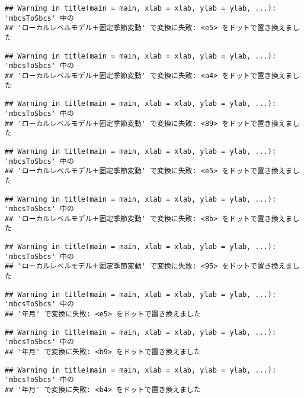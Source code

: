 \documentclass[]{article}
\begin{document}
\begin{verbatim}
## Warning in title(main = main, xlab = xlab, ylab = ylab, ...): 'mbcsToSbcs' 中の
## 'ローカルレベルモデル＋固定季節変動' で変換に失敗: <e5> をドットで置き換えました
\end{verbatim}

\begin{verbatim}
## Warning in title(main = main, xlab = xlab, ylab = ylab, ...): 'mbcsToSbcs' 中の
## 'ローカルレベルモデル＋固定季節変動' で変換に失敗: <a4> をドットで置き換えました
\end{verbatim}

\begin{verbatim}
## Warning in title(main = main, xlab = xlab, ylab = ylab, ...): 'mbcsToSbcs' 中の
## 'ローカルレベルモデル＋固定季節変動' で変換に失敗: <89> をドットで置き換えました
\end{verbatim}

\begin{verbatim}
## Warning in title(main = main, xlab = xlab, ylab = ylab, ...): 'mbcsToSbcs' 中の
## 'ローカルレベルモデル＋固定季節変動' で変換に失敗: <e5> をドットで置き換えました
\end{verbatim}

\begin{verbatim}
## Warning in title(main = main, xlab = xlab, ylab = ylab, ...): 'mbcsToSbcs' 中の
## 'ローカルレベルモデル＋固定季節変動' で変換に失敗: <8b> をドットで置き換えました
\end{verbatim}

\begin{verbatim}
## Warning in title(main = main, xlab = xlab, ylab = ylab, ...): 'mbcsToSbcs' 中の
## 'ローカルレベルモデル＋固定季節変動' で変換に失敗: <95> をドットで置き換えました
\end{verbatim}

\begin{verbatim}
## Warning in title(main = main, xlab = xlab, ylab = ylab, ...): 'mbcsToSbcs' 中の
## '年月' で変換に失敗: <e5> をドットで置き換えました
\end{verbatim}

\begin{verbatim}
## Warning in title(main = main, xlab = xlab, ylab = ylab, ...): 'mbcsToSbcs' 中の
## '年月' で変換に失敗: <b9> をドットで置き換えました
\end{verbatim}

\begin{verbatim}
## Warning in title(main = main, xlab = xlab, ylab = ylab, ...): 'mbcsToSbcs' 中の
## '年月' で変換に失敗: <b4> をドットで置き換えました
\end{verbatim}
\end{document}
